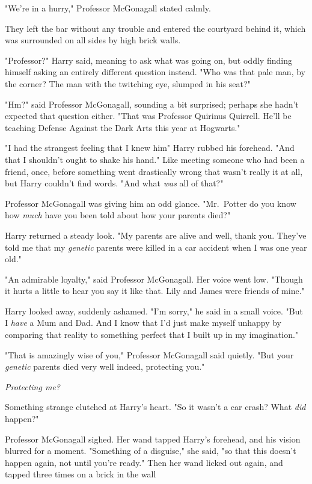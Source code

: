 "We're in a hurry," Professor McGonagall stated calmly.

They left the bar without any trouble and entered the courtyard
behind it, which was surrounded on all sides by high brick walls.

"Professor?" Harry said, meaning to ask what was going on, but oddly
finding himself asking an entirely different question instead.
"Who was that pale man, by the corner? The man with
the twitching eye, slumped in his seat?"

"Hm?" said Professor McGonagall, sounding a bit surprised; perhaps she hadn't
expected that question either. "That was Professor Quirinus Quirrell. He'll be
teaching Defense Against the Dark Arts this year at Hogwarts."

"I had the strangest feeling that I knew him{\el}" Harry rubbed his
forehead. "And that I shouldn't ought to shake his hand." Like meeting someone
who had been a friend, once, before something went drastically wrong{\el}
that wasn't really it at all, but Harry couldn't find words. "And what
\emph{was}{\el} all of that?"

Professor McGonagall was giving him an odd glance. "Mr.~Potter{\el} do you
know{\el} how \emph{much} have you been told{\el} about how your parents
died?"

Harry returned a steady look. "My parents are alive and
well, thank you. They've told me that my \emph{genetic} parents
were killed in a car accident when I was one year old."

"An admirable loyalty," said Professor McGonagall. Her voice went low. "Though
it hurts a little to hear you say it like that. Lily and James were friends of
mine."

Harry looked away, suddenly ashamed. "I'm sorry," he said in a small voice.
"But I \emph{have} a Mum and Dad. And I know that I'd just make myself unhappy
by comparing that reality to{\el} something perfect that I built up in my
imagination."

"That is amazingly wise of you," Professor McGonagall said quietly. "But your
\emph{genetic} parents died very well indeed, protecting you."

\emph{Protecting me?}

Something strange clutched at Harry's heart. "So it{\el}
wasn't a car crash? What \emph{did} happen?"

Professor McGonagall sighed. Her wand tapped Harry's forehead, and his vision
blurred for a moment. "Something of a disguise," she said, "so that this
doesn't happen again, not until you're ready." Then her wand licked out again,
and tapped three times on a brick in the wall{\el}

